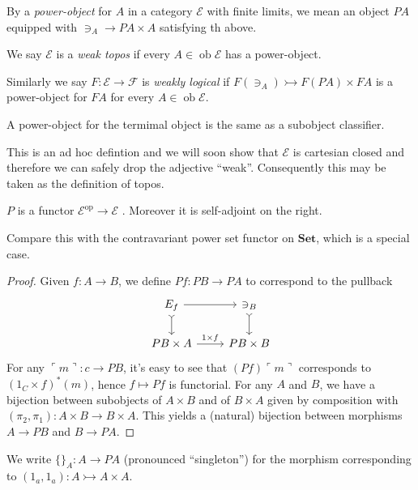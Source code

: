 \documentclass[a4paper]{article}
\renewcommand{\c}[1]{\mathbf{#1}}
\DeclareMathOperator{\ob}{ob}
\newcommand{\Set}{{\c{Set}}}
\newcommand{\mono}{\rightarrowtail}
\begin{document}
\begin{definition}
  By a \emph{power-object} for \(A\) in a category \(\mathcal E\) with finite limits, we mean an object \(PA\) equipped with \(\ni_A \to PA \times A\) satisfying th above.

  We say \(\mathcal E\) is a \emph{weak topos} if every \(A \in \ob \mathcal E\) has a power-object.

  Similarly we say \(F: \mathcal E \to \mathcal F\) is \emph{weakly logical} if \(F(\ni_A) \mono F(PA) \times FA\) is a power-object for \(FA\) for every \(A \in \ob \mathcal E\).
\end{definition}

A power-object for the termimal object is the same as a subobject classifier.

This is an ad hoc defintion and we will soon show that \(\mathcal E\) is cartesian closed and therefore we can safely drop the adjective ``weak''. Consequently this may be taken as the definition of topos.

\begin{lemma}
  \(P\) is a functor \(\mathcal E^{\text{op}} \to \mathcal E\) . Moreover it is self-adjoint on the right.
\end{lemma}

Compare this with the contravariant power set functor on \(\Set\), which is a special case.

\begin{proof}
  Given \(f: A \to B\), we define \(Pf: PB \to PA\) to correspond to the pullback
  \[
    \begin{tikzcd}
      E_f \ar[r] \ar[d, tail] & \ni_B \ar[d, tail] \\
      PB \times A \ar[r, "1 \times f"] & PB \times B
    \end{tikzcd}
  \]
  For any \(\ulcorner m \urcorner: c \to PB\), it's easy to see that \((Pf) \ulcorner m \urcorner\) corresponds to \((1_C \times f)^* (m)\), hence \(f \mapsto Pf\) is functorial. For any \(A\) and \(B\), we have a bijection between subobjects of \(A \times B\) and of \(B \times A\) given by composition with \((\pi_2, \pi_1): A \times B \to B \times A\). This yields a (natural) bijection between morphisms \(A \to PB\) and \(B \to PA\).
\end{proof}

We write \(\{\}_A: A \to PA\) (pronounced ``singleton'') for the morphism corresponding to \((1_a, 1_a): A \mono A \times A\).
\end{document}
